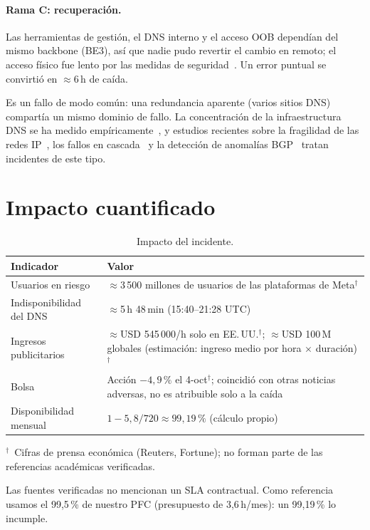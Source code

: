 \documentclass[10pt,a4paper]{article}
\newcommand{\nota}{$^{\dagger}$}
\begin{document}
\paragraph{Rama C: recuperación.} Las herramientas de gestión, el DNS interno y el acceso OOB dependían del mismo backbone (BE3), así que nadie pudo revertir el cambio en remoto; el acceso físico fue lento por las medidas de seguridad~\cite{janardhan2021outage}. Un error puntual se convirtió en $\approx$6\,h de caída.

Es un fallo de modo común: una redundancia aparente (varios sitios DNS) compartía un mismo dominio de fallo. La concentración de la infraestructura DNS se ha medido empíricamente~\cite{xu2023centrality}, y estudios recientes sobre la fragilidad de las redes IP~\cite{owen2025failures}, los fallos en cascada~\cite{zheng2026tolerance} y la detección de anomalías BGP~\cite{wu2025glbad,latifmartinez2025bgp} tratan incidentes de este tipo.

\section{Impacto cuantificado}
\begin{table}[h]
\centering\footnotesize
\caption{Impacto del incidente.}\label{tab:impacto}
\begin{tabularx}{\columnwidth}{@{}l X@{}}
\toprule
\textbf{Indicador} & \textbf{Valor}\\\midrule
Usuarios en riesgo & $\approx$3\,500 millones de usuarios de las plataformas de Meta\nota\\
Indisponibilidad del DNS & $\approx$5\,h 48\,min (15:40--21:28 UTC)~\cite{cloudflare2021facebook}\\
Ingresos publicitarios & $\approx$USD 545\,000/h solo en EE.\,UU.\nota; $\approx$USD 100\,M globales (estimación: ingreso medio por hora $\times$ duración)\nota\\
Bolsa & Acción $-4{,}9\,\%$ el 4-oct\nota; coincidió con otras noticias adversas, no es atribuible solo a la caída\\
Disponibilidad mensual & $1-5{,}8/720\approx 99{,}19\,\%$ (cálculo propio)\\
\bottomrule
\end{tabularx}
{\scriptsize\nota\ Cifras de prensa económica (Reuters, Fortune); no forman parte de las referencias académicas verificadas.}
\end{table}
Las fuentes verificadas no mencionan un SLA contractual. Como referencia usamos el 99,5\,\% de nuestro PFC (presupuesto de 3,6\,h/mes): un 99,19\,\% lo incumple.
\end{document}
